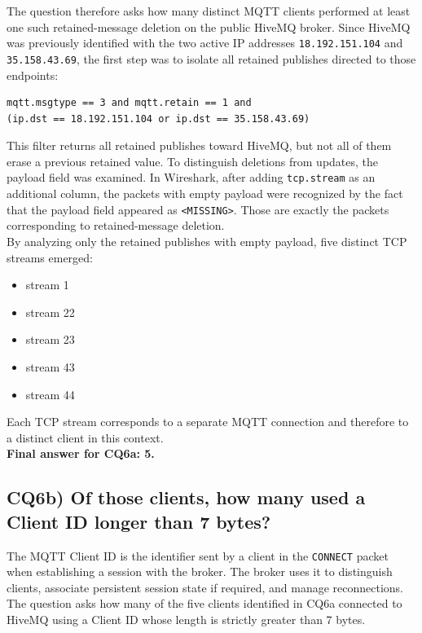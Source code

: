 \documentclass[a4paper,11pt]{article}
\begin{document}
The question therefore asks how many distinct MQTT clients performed at least one such
retained-message deletion on the public HiveMQ broker. Since HiveMQ was previously
identified with the two active IP addresses \texttt{18.192.151.104} and
\texttt{35.158.43.69}, the first step was to isolate all retained publishes directed
to those endpoints:

\begin{lstlisting}
mqtt.msgtype == 3 and mqtt.retain == 1 and
(ip.dst == 18.192.151.104 or ip.dst == 35.158.43.69)
\end{lstlisting}

This filter returns all retained publishes toward HiveMQ, but not all of them erase a
previous retained value. To distinguish deletions from updates, the payload field was
examined. In Wireshark, after adding \texttt{tcp.stream} as an additional column, the
packets with empty payload were recognized by the fact that the payload field appeared
as \texttt{<MISSING>}. Those are exactly the packets corresponding to retained-message
deletion.\\

By analyzing only the retained publishes with empty payload, five distinct TCP
streams emerged:
\begin{itemize}
    \item stream 1
    \item stream 22
    \item stream 23
    \item stream 43
    \item stream 44
\end{itemize}

Each TCP stream corresponds to a separate MQTT connection and therefore to a distinct
client in this context.\\

\textbf{Final answer for CQ6a: 5.}

\subsection{CQ6b) Of those clients, how many used a Client ID longer than 7 bytes?}

The MQTT Client ID is the identifier sent by a client in the \texttt{CONNECT} packet
when establishing a session with the broker. The broker uses it to distinguish
clients, associate persistent session state if required, and manage reconnections. The
question asks how many of the five clients identified in CQ6a connected to HiveMQ
using a Client ID whose length is strictly greater than 7 bytes.\\
\end{document}
